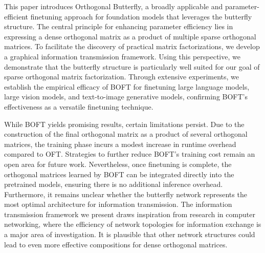 This paper introduces Orthogonal Butterfly, a broadly applicable and parameter-efficient finetuning approach for foundation models that leverages the butterfly structure. The central principle for enhancing parameter efficiency lies in expressing a dense orthogonal matrix as a product of multiple sparse orthogonal matrices. To facilitate the discovery of practical matrix factorizations, we develop a graphical information transmission framework. Using this perspective, we demonstrate that the butterfly structure is particularly well suited for our goal of sparse orthogonal matrix factorization. Through extensive experiments, we establish the empirical efficacy of BOFT for finetuning large language models, large vision models, and text-to-image generative models, confirming BOFT’s effectiveness as a versatile finetuning technique.

While BOFT yields promising results, certain limitations persist. Due to the construction of the final orthogonal matrix as a product of several orthogonal matrices, the training phase incurs a modest increase in runtime overhead compared to OFT. Strategies to further reduce BOFT’s training cost remain an open area for future work. Nevertheless, once finetuning is complete, the orthogonal matrices learned by BOFT can be integrated directly into the pretrained models, ensuring there is no additional inference overhead. Furthermore, it remains unclear whether the butterfly network represents the most optimal architecture for information transmission. The information transmission framework we present draws inspiration from research in computer networking, where the efficiency of network topologies for information exchange is a major area of investigation. It is plausible that other network structures could lead to even more effective compositions for dense orthogonal matrices.